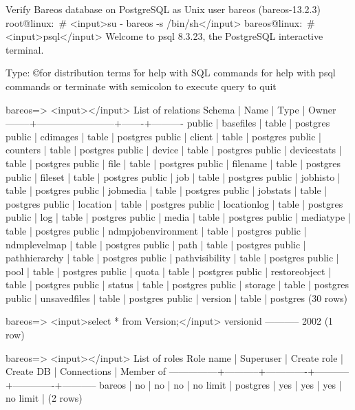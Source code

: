 \begin{commands}{Verify Bareos database on PostgreSQL as Unix user bareos (bareos-13.2.3)}
root@linux:~# <input>su - bareos -s /bin/sh</input>
bareos@linux:~# <input>psql</input>
Welcome to psql 8.3.23, the PostgreSQL interactive terminal.

Type:  \copyright for distribution terms
       \h for help with SQL commands
       \? for help with psql commands
       \g or terminate with semicolon to execute query
       \q to quit

bareos=> <input>\dt</input>
                 List of relations
 Schema |          Name          | Type  |  Owner
--------+------------------------+-------+----------
 public | basefiles              | table | postgres
 public | cdimages               | table | postgres
 public | client                 | table | postgres
 public | counters               | table | postgres
 public | device                 | table | postgres
 public | devicestats            | table | postgres
 public | file                   | table | postgres
 public | filename               | table | postgres
 public | fileset                | table | postgres
 public | job                    | table | postgres
 public | jobhisto               | table | postgres
 public | jobmedia               | table | postgres
 public | jobstats               | table | postgres
 public | location               | table | postgres
 public | locationlog            | table | postgres
 public | log                    | table | postgres
 public | media                  | table | postgres
 public | mediatype              | table | postgres
 public | ndmpjobenvironment     | table | postgres
 public | ndmplevelmap           | table | postgres
 public | path                   | table | postgres
 public | pathhierarchy          | table | postgres
 public | pathvisibility         | table | postgres
 public | pool                   | table | postgres
 public | quota                  | table | postgres
 public | restoreobject          | table | postgres
 public | status                 | table | postgres
 public | storage                | table | postgres
 public | unsavedfiles           | table | postgres
 public | version                | table | postgres
(30 rows)

bareos=> <input>select * from Version;</input>
 versionid
-----------
      2002
(1 row)

bareos=> <input>\du</input>
                                 List of roles
   Role name   | Superuser | Create role | Create DB | Connections | Member of
---------------+-----------+-------------+-----------+-------------+-----------
 bareos        | no        | no          | no        | no limit    | {}
 postgres      | yes       | yes         | yes       | no limit    | {}
(2 rows)


\end{commands}
